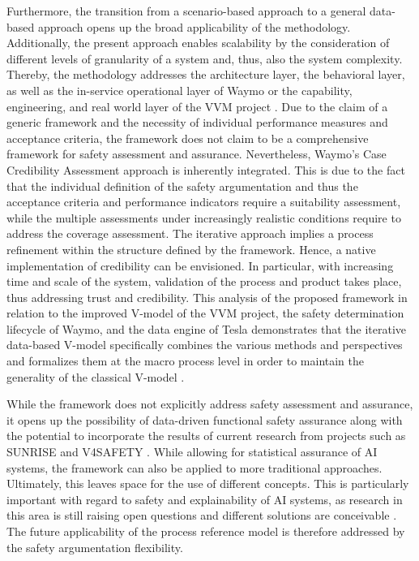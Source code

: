 Furthermore, the transition from a scenario-based approach to a general data-based approach opens up the broad applicability of the methodology. Additionally, the present approach enables scalability by the consideration of different levels of granularity of a system and, thus, also the system complexity. Thereby, the methodology addresses the architecture layer, the behavioral layer, as well as the in-service operational layer of Waymo \cite{karpathy_cvpr21} or the capability, engineering, and real world layer of the VVM project \cite{VVMAPerspectives}. Due to the claim of a generic framework and the necessity of individual performance measures and acceptance criteria, the framework does not claim to be a comprehensive framework for safety assessment and assurance. Nevertheless, Waymo's Case Credibility Assessment \cite{favaro2023building} approach is inherently integrated. This is due to the fact that the individual definition of the safety argumentation and thus the acceptance criteria and performance indicators require a suitability assessment, while the multiple assessments under increasingly realistic conditions require to address the coverage assessment. The iterative approach implies a process refinement within the structure defined by the framework. Hence, a native implementation of credibility \cite{koopman2019credible} can be envisioned. In particular, with increasing time and scale of the system, validation of the process and product takes place, thus addressing trust and credibility. This analysis of the proposed framework in relation to the improved V-model \cite{VVMOverall} of the VVM project, the safety determination lifecycle \cite{favaro2023building} of Waymo, and the data engine \cite{karpathy_cvpr21} of Tesla demonstrates that the iterative data-based V-model specifically combines the various methods and perspectives and formalizes them at the macro process level in order to maintain the generality of the classical V-model \cite{brohl1993v}.

While the framework does not explicitly address safety assessment and assurance, it opens up the possibility of data-driven functional safety assurance along with the potential to incorporate the results of current research from projects such as SUNRISE \cite{SUNRISE} and V4SAFETY \cite{V4SAFETY}. While allowing for statistical assurance of AI systems, the framework can also be applied to more traditional approaches. Ultimately, this leaves space for the use of different concepts. This is particularly important with regard to safety and explainability of AI systems, as research in this area is still raising open questions and different solutions are conceivable \cite{neto2022safety}. The future applicability of the process reference model is therefore addressed by the safety argumentation flexibility.

